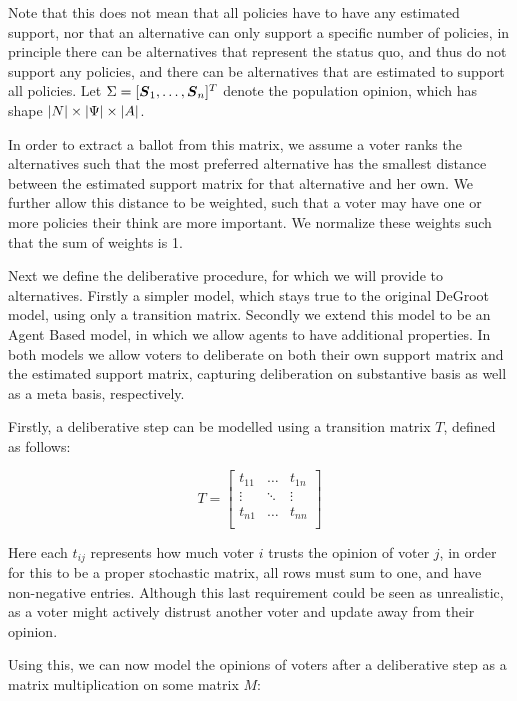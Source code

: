 Note that this does not mean that all policies have to have any estimated support, nor that an alternative can only support a specific number of policies, in principle there can be alternatives that represent the status quo, and thus do not support any policies, and there can be alternatives that are estimated to support all policies.  Let $\Sigma= [\boldsymbol{S}_1, \dots, \boldsymbol{S}_{n}]^{T}$ denote the population opinion, which has shape \(|N| \times |\Psi| \times |A|\).

In order to extract a ballot from this matrix, we assume a voter ranks the alternatives such that the most preferred alternative has the smallest distance between the estimated support matrix for that alternative and her own. We further allow this distance to be weighted, such that a voter may have one or more policies their think are more important. We normalize these weights such that the sum of weights is 1.

Next we define the deliberative procedure, for which we will provide to alternatives. Firstly a simpler model, which stays true to the original DeGroot model, using only a transition matrix. Secondly we extend this model to be an Agent Based model, in which we allow agents to have additional properties. In both models we allow voters to deliberate on both their own support matrix and the estimated support matrix, capturing deliberation on substantive basis as well as a meta basis, respectively.

Firstly, a deliberative step can be modelled using a transition matrix $T$, defined as follows:

\[
	T=\begin{bmatrix}
		t_{11} & \dots  & t_{1n} \\
		\vdots & \ddots & \vdots \\
		t_{n1} & \dots  & t_{nn} \\
	\end{bmatrix}
\]

Here each $t_{ij}$ represents how much voter $i$ trusts the opinion of voter $j$, in order for this to be a proper stochastic matrix, all rows must sum to one, and have non-negative entries. Although this last requirement could be seen as unrealistic, as a voter might actively distrust another voter and update away from their opinion. 

Using this, we can now model the opinions of voters after a deliberative step as a matrix multiplication on some matrix $M$:

